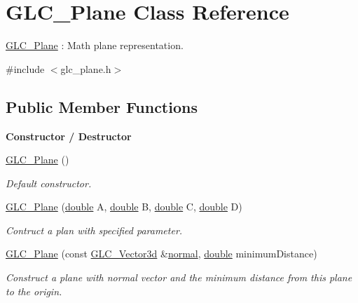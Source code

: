 \hypertarget{class_g_l_c___plane}{\section{G\-L\-C\-\_\-\-Plane Class Reference}
\label{class_g_l_c___plane}
}


\hyperlink{class_g_l_c___plane}{G\-L\-C\-\_\-\-Plane} \-: Math plane representation.  




{\ttfamily \#include $<$glc\-\_\-plane.\-h$>$}

\subsection*{Public Member Functions}
\begin{Indent}{\bf Constructor / Destructor}\par
\begin{DoxyCompactItemize}
\item 
\hyperlink{class_g_l_c___plane_a4f5bdace78dd093bb652af76a9e4f311}{G\-L\-C\-\_\-\-Plane} ()
\begin{DoxyCompactList}\small\item\em Default constructor. \end{DoxyCompactList}\item 
\hyperlink{class_g_l_c___plane_afb44b16bfcd10f4000437b38183a2cec}{G\-L\-C\-\_\-\-Plane} (\hyperlink{_super_l_u_support_8h_a8956b2b9f49bf918deed98379d159ca7}{double} A, \hyperlink{_super_l_u_support_8h_a8956b2b9f49bf918deed98379d159ca7}{double} B, \hyperlink{_super_l_u_support_8h_a8956b2b9f49bf918deed98379d159ca7}{double} C, \hyperlink{_super_l_u_support_8h_a8956b2b9f49bf918deed98379d159ca7}{double} D)
\begin{DoxyCompactList}\small\item\em Contruct a plan with specified parameter. \end{DoxyCompactList}\item 
\hyperlink{class_g_l_c___plane_ae27bc48266badf34cc7105379f69863a}{G\-L\-C\-\_\-\-Plane} (const \hyperlink{class_g_l_c___vector3d}{G\-L\-C\-\_\-\-Vector3d} \&\hyperlink{class_g_l_c___plane_aa06b8755a25fd36ef2dd8664a72c5152}{normal}, \hyperlink{_super_l_u_support_8h_a8956b2b9f49bf918deed98379d159ca7}{double} minimum\-Distance)
\begin{DoxyCompactList}\small\item\em Construct a plane with normal vector and the minimum distance from this plane to the origin. \end{DoxyCompactList}\item 

\end{DoxyCompactItemize}
\end{Indent}
